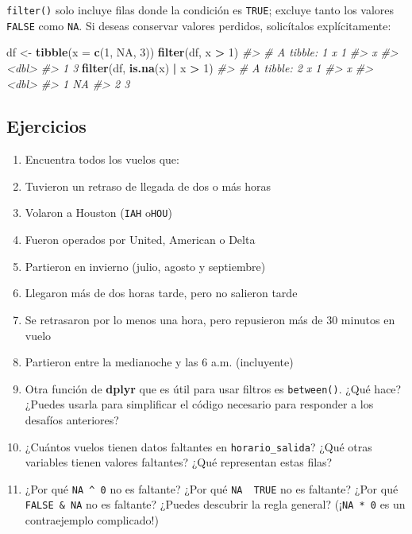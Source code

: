 \documentclass[11pt,oneside]{report}
\newenvironment{Shaded}{\begin{snugshade}}{\end{snugshade}}
\newcommand{\CommentTok}[1]{\textcolor[rgb]{0.56,0.35,0.01}{\textit{#1}}}
\newcommand{\DataTypeTok}[1]{\textcolor[rgb]{0.13,0.29,0.53}{#1}}
\newcommand{\DecValTok}[1]{\textcolor[rgb]{0.00,0.00,0.81}{#1}}
\newcommand{\KeywordTok}[1]{\textcolor[rgb]{0.13,0.29,0.53}{\textbf{#1}}}
\newcommand{\NormalTok}[1]{#1}
\newcommand{\OperatorTok}[1]{\textcolor[rgb]{0.81,0.36,0.00}{\textbf{#1}}}
\newcommand{\OtherTok}[1]{\textcolor[rgb]{0.56,0.35,0.01}{#1}}
\newcommand{\StringTok}[1]{\textcolor[rgb]{0.31,0.60,0.02}{#1}}
\begin{document}
\texttt{filter()} solo incluye filas donde la condición es
\texttt{TRUE}; excluye tanto los valores \texttt{FALSE} como
\texttt{NA}. Si deseas conservar valores perdidos, solicítalos
explícitamente:

\begin{Shaded}
\begin{Highlighting}[]
\NormalTok{df <-}\StringTok{ }\KeywordTok{tibble}\NormalTok{(}\DataTypeTok{x =} \KeywordTok{c}\NormalTok{(}\DecValTok{1}\NormalTok{, }\OtherTok{NA}\NormalTok{, }\DecValTok{3}\NormalTok{))}
\KeywordTok{filter}\NormalTok{(df, x }\OperatorTok{>}\StringTok{ }\DecValTok{1}\NormalTok{)}
\CommentTok{#> # A tibble: 1 x 1}
\CommentTok{#>       x}
\CommentTok{#>   <dbl>}
\CommentTok{#> 1     3}
\KeywordTok{filter}\NormalTok{(df, }\KeywordTok{is.na}\NormalTok{(x) }\OperatorTok{|}\StringTok{ }\NormalTok{x }\OperatorTok{>}\StringTok{ }\DecValTok{1}\NormalTok{)}
\CommentTok{#> # A tibble: 2 x 1}
\CommentTok{#>       x}
\CommentTok{#>   <dbl>}
\CommentTok{#> 1    NA}
\CommentTok{#> 2     3}
\end{Highlighting}
\end{Shaded}

\hypertarget{ejercicios-8}{%
\subsection{Ejercicios}\label{ejercicios-8}}

\begin{enumerate}
\def\labelenumi{\arabic{enumi}.}
\item
  Encuentra todos los vuelos que:
\item
  Tuvieron un retraso de llegada de dos o más horas
\item
  Volaron a Houston (\texttt{IAH} o\texttt{HOU})
\item
  Fueron operados por United, American o Delta
\item
  Partieron en invierno (julio, agosto y septiembre)
\item
  Llegaron más de dos horas tarde, pero no salieron tarde
\item
  Se retrasaron por lo menos una hora, pero repusieron más de 30 minutos
  en vuelo
\item
  Partieron entre la medianoche y las 6 a.m. (incluyente)
\item
  Otra función de \textbf{dplyr} que es útil para usar filtros es
  \texttt{between()}. ¿Qué hace? ¿Puedes usarla para simplificar el
  código necesario para responder a los desafíos anteriores?
\item
  ¿Cuántos vuelos tienen datos faltantes en \texttt{horario\_salida}?
  ¿Qué otras variables tienen valores faltantes? ¿Qué representan estas
  filas?
\item
  ¿Por qué \texttt{NA\ \^{}\ 0} no es faltante? ¿Por qué
  \texttt{NA\ \textbar{}\ TRUE} no es faltante? ¿Por qué
  \texttt{FALSE\ \&\ NA} no es faltante? ¿Puedes descubrir la regla
  general? (¡\texttt{NA\ *\ 0} es un contraejemplo complicado!)
\end{enumerate}
\end{document}
